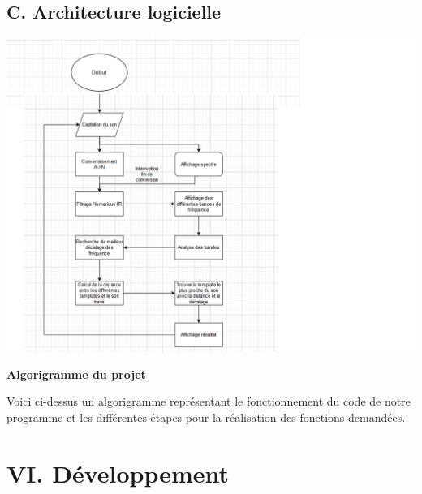 \documentclass[a4paper,11pt]{book}
\begin{document}
\subsection*{C. Architecture logicielle}
\includegraphics[width=\textwidth]{template_PRJ_TEX_FR/algorigramme.png}
\begin{center} \underline{\textbf{Algorigramme du projet}} 
\end{center}
Voici ci-dessus un algorigramme représentant le fonctionnement du code de notre programme et les différentes étapes pour la réalisation des fonctions demandées.
\newpage
\section*{VI. Développement}
\end{document}
